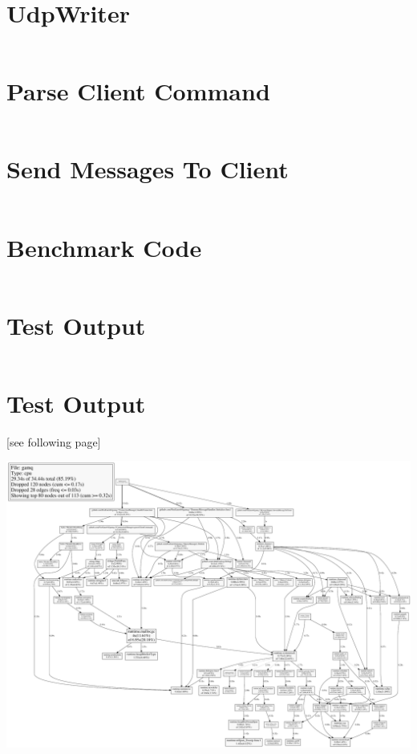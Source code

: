\chapter{UdpWriter}
\label{appendix:udpWriter}

\inputminted[breaklines=true, breakanywhere]{go}{code/gamq/udp/udpwriter.go}

\chapter{Parse Client Command}
\label{appendix:parseClientCommand}

\inputminted[breaklines=true, breakanywhere, firstline=226, lastline=260]{go}{code/gamq/connectionmanager.go}

\chapter{Send Messages To Client}
\label{appendix:sendMessagesToClient}

\inputminted[breaklines=true, breakanywhere, firstline=35, lastline=67]{go}{code/gamq/messageshipper.go}

\chapter{Benchmark Code}
\label{chap:benchmarkCode}

\inputminted[breaklines]{python}{code/gamq/tools/benchmark/benchmark.py}

\chapter{Test Output}
\label{chap:testOutput}

\inputminted[breaklines]{bash}{code/goTestOutput}

\chapter{Test Output}
\label{chap:testOutput}
[see following page]
\begin{landscape}
\includegraphics[width=\textwidth]{figures/profileOutput}
\end{landscape}
